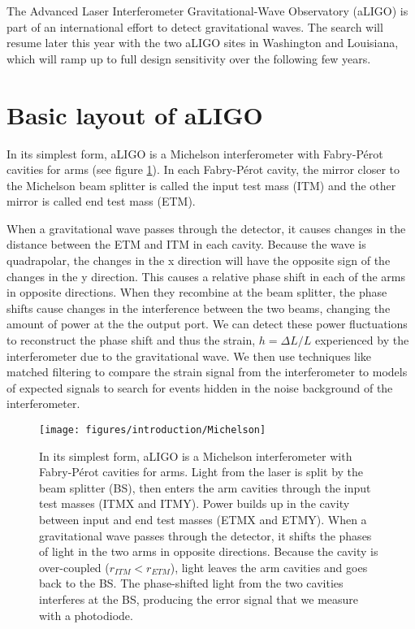 The Advanced Laser Interferometer Gravitational-Wave Observatory (aLIGO) is part of an international effort to detect gravitational waves. 
The search will resume later this year with the two aLIGO sites in Washington and Louisiana, which will ramp up to full design sensitivity over the following few years.

\section{Basic layout of aLIGO}

In its simplest form, aLIGO is a Michelson interferometer with Fabry-P\'erot cavities for arms (see figure \ref{fig:michelson}). In each Fabry-P\'erot cavity, the mirror closer to the Michelson beam splitter is called the input test mass (ITM) and the other mirror is called end test mass (ETM).

When a gravitational wave passes through the detector, it causes changes in the distance between the ETM and ITM in each cavity. Because the wave is quadrapolar, the changes in the x direction will have the opposite sign of the changes in the y direction. This causes a relative phase shift in each of the arms in opposite directions. When they recombine at the beam splitter, the phase shifts cause changes in the interference between the two beams, changing the amount of power at the the output port. We can detect these power fluctuations to reconstruct the phase shift and thus the strain, $h=\Delta L/L$ experienced by the interferometer due to the gravitational wave. We then use techniques like matched filtering to compare the strain signal from the interferometer to models of expected signals to search for events hidden in the noise background of the interferometer. 


\begin{figure}[htp]%
\center
\texttt{[image: figures/introduction/Michelson]}%
\caption[Simplified LIGO Layout]{In its simplest form, aLIGO is a Michelson interferometer with Fabry-P\'erot cavities for arms. Light from the laser is split by the beam splitter (BS), then enters the arm cavities through the input test masses (ITMX and ITMY). Power builds up in the cavity between input and end test masses (ETMX and ETMY). When a gravitational wave passes through the detector, it shifts the phases of light in the two arms in opposite directions. Because the cavity is over-coupled ($r_{ITM}<r_{ETM}$), light leaves the arm cavities and goes back to the BS. The phase-shifted light from the two cavities interferes at the BS, producing the error signal that we measure with a photodiode.}%
\label{fig:michelson}
\end{figure}

